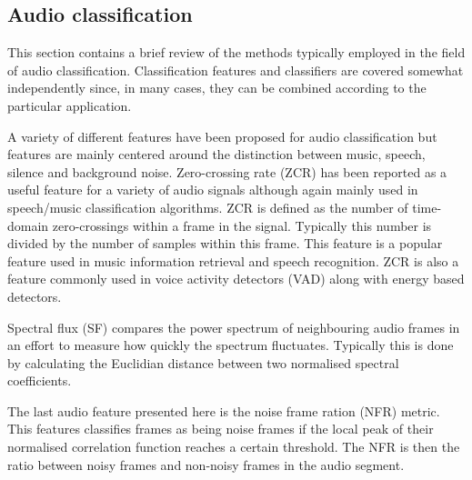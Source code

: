 %

\subsection{Audio classification}
This section contains a brief review of the methods typically employed in the field of audio classification. Classification features and classifiers are covered somewhat independently since, in many cases, they can be combined according to the particular application.

A variety of different features have been proposed for audio classification but features are mainly centered around the distinction between music, speech, silence and background noise. Zero-crossing rate (ZCR) has been reported as a useful feature for a variety of audio signals although again mainly used in speech/music classification algorithms\cite{Lu2002}. ZCR is defined as the number of time-domain zero-crossings within a frame in the signal. Typically this number is divided by the number of samples within this frame. This feature is a popular feature used in music information retrieval and speech recognition\cite{Saraceno1997}\cite{Scheirer1997}\cite{Gouyon2000}. ZCR is also a feature commonly used in voice activity detectors (VAD) along with energy based detectors\cite{Sangwan2002}.

Spectral flux (SF) compares the power spectrum of neighbouring audio frames in an effort to measure how quickly the spectrum fluctuates. Typically this is done by calculating the Euclidian distance between two normalised spectral coefficients\cite{Wang2012}.

The last audio feature presented here is the noise frame ration (NFR) metric. This features classifies frames as being noise frames if the local peak of their normalised correlation function reaches a certain threshold. The NFR is then the ratio between noisy frames and non-noisy frames in the audio segment\cite{Lu2002}\cite{Jiang2000}. 

